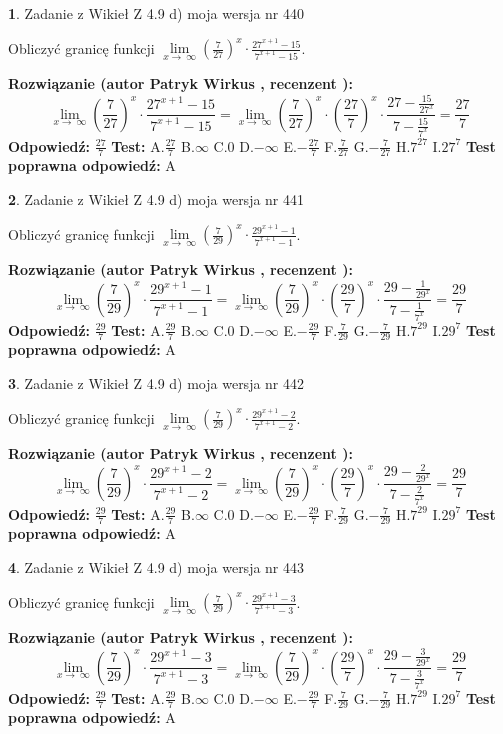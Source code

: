 \documentclass[12pt, a4paper]{article}
\theoremstyle{definition} %
\newtheorem{zad}{}
\newcommand{\zadStart}[1]{\begin{zad}#1\newline}
\newcommand{\zadStop}{\end{zad}}
\newcommand{\rozwStart}[2]{\noindent \textbf{Rozwiązanie (autor #1 , recenzent #2): }\newline}
\newcommand{\rozwStop}{\newline}
\newcommand{\odpStart}{\noindent \textbf{Odpowiedź:}\newline}
\newcommand{\odpStop}{\newline}
\newcommand{\testStart}{\noindent \textbf{Test:}\newline}
\newcommand{\testStop}{\newline}
\newcommand{\kluczStart}{\noindent \textbf{Test poprawna odpowiedź:}\newline}
\newcommand{\kluczStop}{\newline}
\begin{document}
\zadStart{Zadanie z Wikieł Z 4.9 d) moja wersja nr 440}


Obliczyć granicę funkcji  $\lim\limits_{x\to\ \infty}(\frac{7}{27})^{x}\cdot\frac{27^{x+1}-15}{7^{x+1}-15}$.
\zadStop
\rozwStart{Patryk Wirkus}{}
$$\lim\limits_{x\to\ \infty}(\frac{7}{27})^{x}\cdot\frac{27^{x+1}-15}{7^{x+1}-15}=\lim\limits_{x\to\ \infty}(\frac{7}{27})^{x}\cdot(\frac{27}{7})^{x} \cdot \frac{27-\frac{15}{27^{x}}}{7-\frac{15}{7^{x}}} = \frac{27}{7}$$
\rozwStop
\odpStart
$\frac{27}{7}$
\odpStop
\testStart
A.$\frac{27}{7}$ B.$\infty$ C.$0$ D.$-\infty$ E.$-\frac{27}{7}$
F.$\frac{7}{27}$ G.$-\frac{7}{27}$
H.$7^{27}$
I.$27^{7}$
\testStop
\kluczStart
A
\kluczStop



\zadStart{Zadanie z Wikieł Z 4.9 d) moja wersja nr 441}


Obliczyć granicę funkcji  $\lim\limits_{x\to\ \infty}(\frac{7}{29})^{x}\cdot\frac{29^{x+1}-1}{7^{x+1}-1}$.
\zadStop
\rozwStart{Patryk Wirkus}{}
$$\lim\limits_{x\to\ \infty}(\frac{7}{29})^{x}\cdot\frac{29^{x+1}-1}{7^{x+1}-1}=\lim\limits_{x\to\ \infty}(\frac{7}{29})^{x}\cdot(\frac{29}{7})^{x} \cdot \frac{29-\frac{1}{29^{x}}}{7-\frac{1}{7^{x}}} = \frac{29}{7}$$
\rozwStop
\odpStart
$\frac{29}{7}$
\odpStop
\testStart
A.$\frac{29}{7}$ B.$\infty$ C.$0$ D.$-\infty$ E.$-\frac{29}{7}$
F.$\frac{7}{29}$ G.$-\frac{7}{29}$
H.$7^{29}$
I.$29^{7}$
\testStop
\kluczStart
A
\kluczStop



\zadStart{Zadanie z Wikieł Z 4.9 d) moja wersja nr 442}


Obliczyć granicę funkcji  $\lim\limits_{x\to\ \infty}(\frac{7}{29})^{x}\cdot\frac{29^{x+1}-2}{7^{x+1}-2}$.
\zadStop
\rozwStart{Patryk Wirkus}{}
$$\lim\limits_{x\to\ \infty}(\frac{7}{29})^{x}\cdot\frac{29^{x+1}-2}{7^{x+1}-2}=\lim\limits_{x\to\ \infty}(\frac{7}{29})^{x}\cdot(\frac{29}{7})^{x} \cdot \frac{29-\frac{2}{29^{x}}}{7-\frac{2}{7^{x}}} = \frac{29}{7}$$
\rozwStop
\odpStart
$\frac{29}{7}$
\odpStop
\testStart
A.$\frac{29}{7}$ B.$\infty$ C.$0$ D.$-\infty$ E.$-\frac{29}{7}$
F.$\frac{7}{29}$ G.$-\frac{7}{29}$
H.$7^{29}$
I.$29^{7}$
\testStop
\kluczStart
A
\kluczStop



\zadStart{Zadanie z Wikieł Z 4.9 d) moja wersja nr 443}


Obliczyć granicę funkcji  $\lim\limits_{x\to\ \infty}(\frac{7}{29})^{x}\cdot\frac{29^{x+1}-3}{7^{x+1}-3}$.
\zadStop
\rozwStart{Patryk Wirkus}{}
$$\lim\limits_{x\to\ \infty}(\frac{7}{29})^{x}\cdot\frac{29^{x+1}-3}{7^{x+1}-3}=\lim\limits_{x\to\ \infty}(\frac{7}{29})^{x}\cdot(\frac{29}{7})^{x} \cdot \frac{29-\frac{3}{29^{x}}}{7-\frac{3}{7^{x}}} = \frac{29}{7}$$
\rozwStop
\odpStart
$\frac{29}{7}$
\odpStop
\testStart
A.$\frac{29}{7}$ B.$\infty$ C.$0$ D.$-\infty$ E.$-\frac{29}{7}$
F.$\frac{7}{29}$ G.$-\frac{7}{29}$
H.$7^{29}$
I.$29^{7}$
\testStop
\kluczStart
A
\kluczStop
\end{document}
